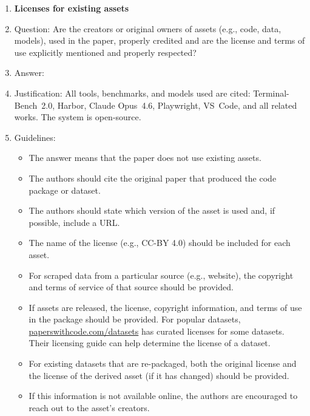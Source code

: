 \documentclass{article}
\begin{document}
\begin{enumerate}
\item {\bf Licenses for existing assets}
    \item[] Question: Are the creators or original owners of assets (e.g., code, data, models), used in the paper, properly credited and are the license and terms of use explicitly mentioned and properly respected?
    \item[] Answer: \answerYes{}
    \item[] Justification: All tools, benchmarks, and models used are cited: Terminal-Bench~2.0, Harbor, Claude Opus~4.6, Playwright, VS~Code, and all related works. The system is open-source.
    \item[] Guidelines:
    \begin{itemize}
        \item The answer \answerNA{} means that the paper does not use existing assets.
        \item The authors should cite the original paper that produced the code package or dataset.
        \item The authors should state which version of the asset is used and, if possible, include a URL.
        \item The name of the license (e.g., CC-BY 4.0) should be included for each asset.
        \item For scraped data from a particular source (e.g., website), the copyright and terms of service of that source should be provided.
        \item If assets are released, the license, copyright information, and terms of use in the package should be provided. For popular datasets, \url{paperswithcode.com/datasets} has curated licenses for some datasets. Their licensing guide can help determine the license of a dataset.
        \item For existing datasets that are re-packaged, both the original license and the license of the derived asset (if it has changed) should be provided.
        \item If this information is not available online, the authors are encouraged to reach out to the asset's creators.
    \end{itemize}


\end{enumerate}
\end{document}
